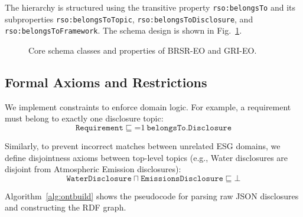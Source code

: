 \documentclass[journal,compsoc]{IEEEtran}
\begin{document}
The hierarchy is structured using the transitive property \texttt{rso:belongsTo} and its subproperties \texttt{rso:belongsToTopic}, \texttt{rso:belongsToDisclosure}, and \texttt{rso:belongsToFramework}. The schema design is shown in Fig.~\ref{fig:ontology}.

\begin{figure}[h]
\centering
{}
\caption{Core schema classes and properties of BRSR-EO and GRI-EO.}
\label{fig:ontology}
\end{figure}

\subsection{Formal Axioms and Restrictions}
We implement constraints to enforce domain logic. For example, a requirement must belong to exactly one disclosure topic:
\begin{equation}
\texttt{Requirement} \sqsubseteq \mathord{=} 1\ \texttt{belongsTo}.\texttt{Disclosure}
\end{equation}

Similarly, to prevent incorrect matches between unrelated ESG domains, we define disjointness axioms between top-level topics (e.g., Water disclosures are disjoint from Atmospheric Emission disclosures):
\begin{equation}
\texttt{WaterDisclosure} \sqcap \texttt{EmissionsDisclosure} \sqsubseteq \bot
\end{equation}

Algorithm~\ref{alg:ontbuild} shows the pseudocode for parsing raw JSON disclosures and constructing the RDF graph.
\end{document}
